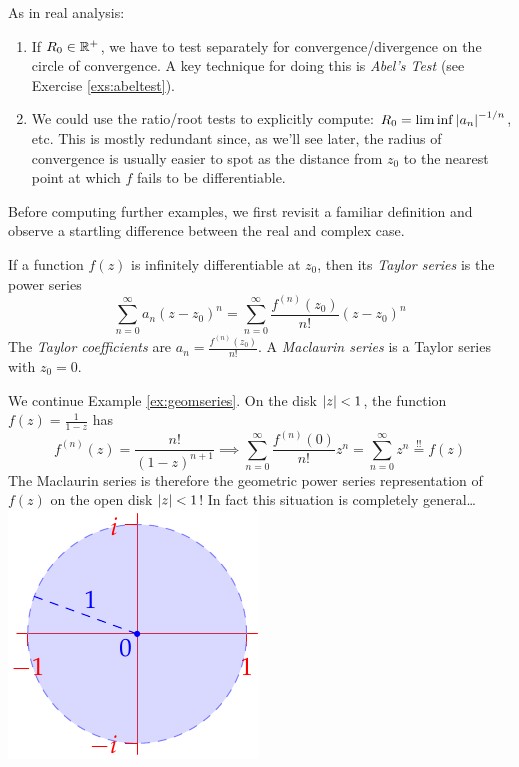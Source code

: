 As in real analysis:
\begin{enumerate}
  \item If $R_0\in\mathbb{R}^+$, we have to test separately for convergence/divergence on the circle of convergence. A key technique for doing this is \emph{Abel's Test} (see Exercise \ref{exs:abeltest}).
  \item\label{obs:dist} We could use the ratio/root tests to explicitly compute: $R_0=\liminf\left| a_n\right|^{-1/n}$, etc. This is mostly redundant since, as we'll see later, the radius of convergence is usually easier to spot as the distance from $z_0$ to the nearest point at which $f$ fails to be differentiable.
\end{enumerate}

Before computing further examples, we first revisit a familiar definition and observe a startling difference between the real and complex case.

\begin{defn}{}{}
If a function $f(z)$ is infinitely differentiable at $z_0$, then its \emph{Taylor series} is the power series
\[\sum_{n=0}^\infty a_n(z-z_0)^n= \sum_{n=0}^\infty \frac{f^{(n)}(z_0)}{n!}(z-z_0)^n\]
The \emph{Taylor coefficients} are $a_n=\frac{f^{(n)}(z_0)}{n!}$. A \emph{Maclaurin series} is a Taylor series with $z_0=0$.
\end{defn}

\begin{tcolorbox}[exstyle,lower separated=false, sidebyside, sidebyside align=top seam, sidebyside gap=0pt, righthand width=0.26\linewidth]
We continue Example \ref{ex:geomseries}. On the disk $\left| z\right|<1$, the function $f(z)=\frac 1{1-z}$ has 
  	\[f^{(n)}(z)=\frac{n!}{(1-z)^{n+1}}\implies \sum\limits_{n=0}^\infty\frac{f^{(n)}(0)}{n!}z^n =\sum\limits_{n=0}^\infty z^n\overset{\text{!!}}{=}f(z)\]
  	The Maclaurin series is therefore the geometric power series representation of $f(z)$ on the open disk $\left| z\right|<1$! %
  	In fact this situation is completely general\ldots
\tcblower
  \flushright\includegraphics{taylorex1}
\end{tcolorbox}
\goodbreak

